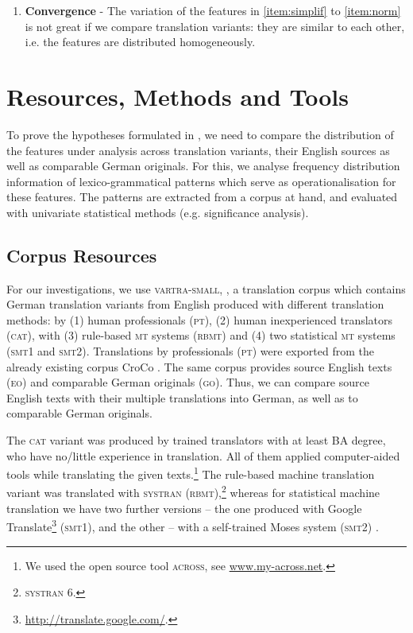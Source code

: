 \documentclass[output=paper]{LSP/langsci}
\begin{document}
\begin{enumerate}
\item \textbf{Convergence} - The variation of the features in \ref{item:simplif} to \ref{item:norm} is not great if we compare translation variants: they are similar to each other, i.e. the features are distributed homogeneously.
\end{enumerate}

\section{Resources, Methods and Tools} \label{sec:4:3}

To prove the hypotheses formulated in , we need to compare the distribution of the features under analysis across translation variants, their English sources as well as comparable German originals. For this, we analyse frequency distribution information of lexico-grammatical patterns which serve as operationalisation for these features. The patterns are extracted from a corpus at hand, and evaluated with univariate statistical methods (e.g. significance analysis).

\subsection{Corpus Resources} \label{sec:4:3:1}
For our investigations, we use \textsc{vartra}-\textsc{small}, \citep[see][]{Lapshinova2013}, a translation corpus which contains German translation variants from English produced with different translation methods: by (1) human professionals (\textsc{pt}), (2) human inexperienced translators (\textsc{cat}), with (3) rule-based \textsc{mt} systems (\textsc{rbmt}) and (4) two statistical \textsc{mt} systems (\textsc{smt}1 and \textsc{smt}2). Translations by professionals (\textsc{pt}) were exported from the already existing corpus CroCo \citep{HansenSchirra2013}. The same corpus provides source English texts (\textsc{eo}) and comparable German originals (\textsc{go}). Thus, we can compare source English texts with their multiple translations into German, as well as to comparable German originals.

The \textsc{cat} variant was produced by trained translators with at least \textsc{BA} degree, who have no/little experience in translation. All of them applied computer-aided tools while translating the given texts.\footnote{We used the open source tool \textsc{across}, see \url{www.my-across.net}.} The rule-based machine translation variant was translated with \textsc{sy}\textsc{stran} (\textsc{rbmt}),\footnote{\textsc{sy}\textsc{stran} 6.} whereas for statistical machine translation we have two further versions – the one produced with Google Translate\footnote{\url{http://translate.google.com/}.} (\textsc{smt}1), and the other -- with a self-trained Moses system (\textsc{smt}2) \citep[see][]{Hoang2007}.
\end{document}
